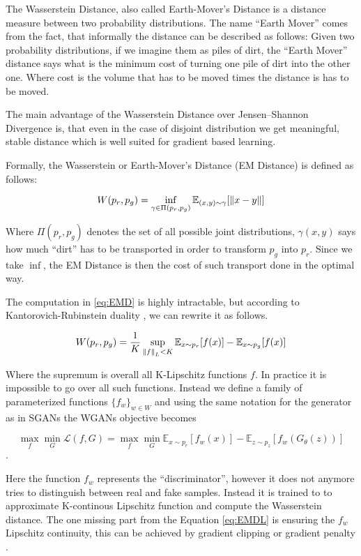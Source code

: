 The Wasserstein Distance, also called Earth-Mover's Distance is a distance
measure between two probability distributions. The name ``Earth Mover'' comes
from the fact, that informally the distance can be described as follows: Given
two probability distributions, if we imagine them as piles of dirt, the ``Earth
Mover'' distance says what is the minimum cost of turning one pile of dirt into the
other one. Where cost is the volume that has to be moved times the distance is
has to be moved.

The main advantage of the Wasserstein Distance over Jensen–Shannon Divergence is,
that even in the case of disjoint distribution we get meaningful, stable
distance which is well suited for gradient based learning.

Formally, the Wasserstein or Earth-Mover's Distance (EM Distance) is defined as
follows:

\begin{equation}
  \label{eq:EMD}
  W(p_r, p_g) = \inf_{\gamma \in \Pi(p_r, p_g)} \mathbb{E}_{(x, y) \sim \gamma}[\left\lVert x-y\right\rVert]
\end{equation}

Where $\Pi(p_r, p_g)$ denotes the set of all possible joint distributions,
$\gamma(x,y)$ says how much ``dirt'' has to be transported in order to transform
$p_g$ into $p_r$. Since we take $\inf$, the EM Distance is then the cost of such
transport done in the optimal way. 

The computation in \ref{eq:EMD} is highly intractable, but according to
Kantorovich-Rubinstein duality \cite{villani@optimal}, we can rewrite it as
follows.

\begin{equation}
  \label{eq:EMD2}
  W(p_r, p_g) = \frac{1}{K} \sup_{\left\lVert f\right\rVert_L < K} \mathbb{E}_{x \sim p_r}[f(x)] - \mathbb{E}_{x \sim p_g}[f(x)]
\end{equation}

Where the supremum is overall all K-Lipschitz functions $f$. In practice it is
impossible to go over all such functions. Instead we define a family of parameterized
functions $\{f_{w}\}_{w \in W}$ and using the same notation for the generator as
in SGANs the WGANs objective becomes


\begin{equation}
  \label{eq:EMDL}
  \max_{f}\min_{G}\mathcal{L}(f, G) = \max_{f}\min_{G}  \mathbb{E}_{x \sim p_r}[f_w(x)] - \mathbb{E}_{z \sim p_z}[f_w(G_{\theta}(z))]
\end{equation}.

Here the function $f_w$ represents the ``discriminator'', however it does not
anymore tries to distinguish between real and fake samples. Instead it is
trained to to approximate K-continous Lipschitz function and compute the
Wasserstein distance. The one missing part from the Equation \ref{eq:EMDL} is
ensuring the $f_w$ Lipschitz continuity, this can be achieved by gradient
clipping \cite{arjovsky2017wasserstein} or gradient penalty \cite{gulrajani2017improved}.

